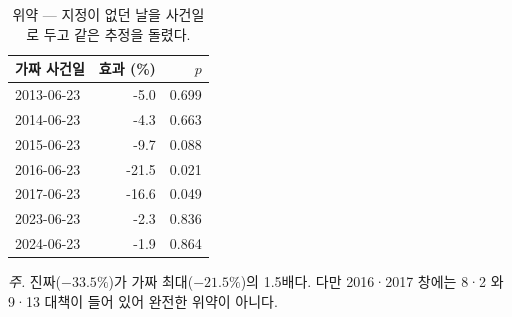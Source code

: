\begin{table}[htbp]
  \centering
  \caption{위약 --- 지정이 없던 날을 사건일로 두고 같은 추정을 돌렸다.}
  \label{tab:placebo-date}
  \begin{tabular}{lrr}
    \toprule
    \textbf{가짜 사건일} & \textbf{효과 (\%)} & \textbf{$p$} \\
    \midrule
    2013-06-23 & -5.0 & 0.699 \\
    2014-06-23 & -4.3 & 0.663 \\
    2015-06-23 & -9.7 & 0.088 \\
    2016-06-23 & -21.5 & 0.021 \\
    2017-06-23 & -16.6 & 0.049 \\
    2023-06-23 & -2.3 & 0.836 \\
    2024-06-23 & -1.9 & 0.864 \\
    \bottomrule
  \end{tabular}

  \begin{minipage}{\linewidth}\footnotesize
  \textit{주.} 진짜($-33.5\%$)가 가짜 최대($-21.5\%$)의 1.5배다. 다만 2016·2017 창에는 8·2 와 9·13 대책이 들어 있어 완전한 위약이 아니다.
  \end{minipage}
\end{table}
